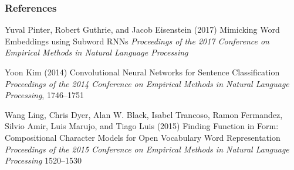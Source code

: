 \begin{frame}
    \frametitle{References}
    \fontsize{8}{4}\selectfont
    \begin{thebibliography}{99} %
         Yuval Pinter, Robert Guthrie,
         and Jacob Eisenstein (2017)
        \newblock Mimicking Word Embeddings using Subword RNNs
        \newblock \emph{Proceedings of the 2017 Conference on Empirical Methods in Natural Language Processing} 

         Yoon Kim (2014)
        \newblock Convolutional Neural Networks for Sentence Classification
        \newblock \emph{Proceedings of the 2014 Conference on Empirical Methods in Natural Language Processing}, 1746--1751
    
         Wang Ling, Chris Dyer, Alan W.
        Black, Isabel Trancoso, Ramon Fermandez, Silvio Amir, Luis
        Marujo, and Tiago Luis (2015)
        \newblock Finding Function in Form: Compositional Character Models for Open Vocabulary Word Representation
        \newblock \emph{Proceedings of the 2015 Conference on Empirical Methods in Natural Language Processing} 1520--1530
    \end{thebibliography}
    
\end{frame}